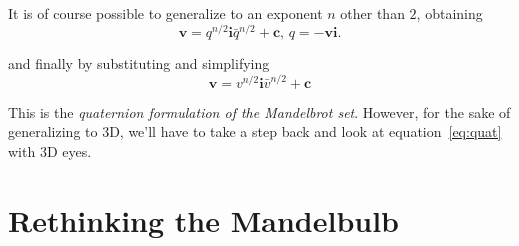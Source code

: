 \documentclass{article}
\let\vec\mathbf
\begin{document}
\noindent
It is of course possible to generalize to an exponent $n$ other
than $2$, obtaining
\begin{equation}
\label{eq:quat}
\vec{v}=q^{n/2} \vec{i} \bar q^{n/2}+\vec{c}\text{, }q=-\vec{v}\vec{i}.
\end{equation}

\noindent
and finally by substituting and simplifying
\begin{equation*}
\vec{v}=v^{n/2} \vec{i} \bar v^{n/2}+\vec{c}
\end{equation*}

This is the \emph{quaternion formulation of the Mandelbrot set}.  However,
for the sake of generalizing to 3D, we'll have to take a step back and
look at equation~\ref{eq:quat} with 3D eyes.

\section{Rethinking the Mandelbulb}

\end{document}
